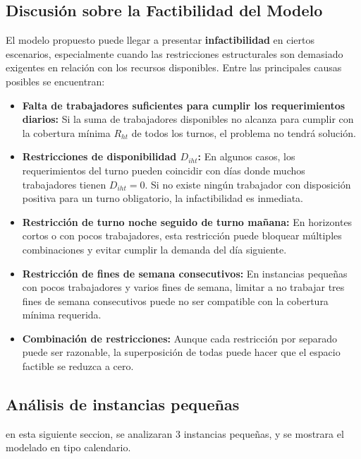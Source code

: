 \documentclass{article}
\begin{document}
\subsection*{Discusión sobre la Factibilidad del Modelo}

El modelo propuesto puede llegar a presentar \textbf{infactibilidad} en ciertos escenarios, especialmente cuando las restricciones estructurales son demasiado exigentes en relación con los recursos disponibles. Entre las principales causas posibles se encuentran:

\begin{itemize}
    \item \textbf{Falta de trabajadores suficientes para cumplir los requerimientos diarios:}  
    Si la suma de trabajadores disponibles no alcanza para cumplir con la cobertura mínima $R_{ht}$ de todos los turnos, el problema no tendrá solución.

    \item \textbf{Restricciones de disponibilidad $D_{iht}$:}  
    En algunos casos, los requerimientos del turno pueden coincidir con días donde muchos trabajadores tienen $D_{iht} = 0$.  
    Si no existe ningún trabajador con disposición positiva para un turno obligatorio, la infactibilidad es inmediata.

    \item \textbf{Restricción de turno noche seguido de turno mañana:}  
    En horizontes cortos o con pocos trabajadores, esta restricción puede bloquear múltiples combinaciones y evitar cumplir la demanda del día siguiente.

    \item \textbf{Restricción de fines de semana consecutivos:}  
    En instancias pequeñas con pocos trabajadores y varios fines de semana, limitar a no trabajar tres fines de semana consecutivos puede no ser compatible con la cobertura mínima requerida.

    \item \textbf{Combinación de restricciones:}  
    Aunque cada restricción por separado puede ser razonable, la superposición de todas puede hacer que el espacio factible se reduzca a cero.
\end{itemize}

\subsection*{Análisis de instancias pequeñas}

en esta siguiente seccion, se analizaran 3 instancias pequeñas, y se mostrara el modelado en tipo calendario.
\end{document}
